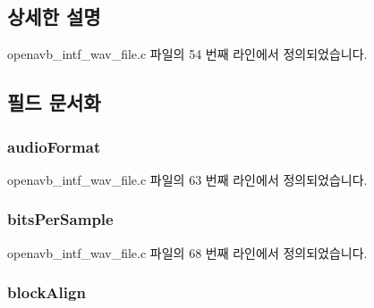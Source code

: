 \subsection{상세한 설명}


openavb\+\_\+intf\+\_\+wav\+\_\+file.\+c 파일의 54 번째 라인에서 정의되었습니다.



\subsection{필드 문서화}
\subsubsection[{\texorpdfstring{audio\+Format}{audioFormat}}]{ audio\+Format}\hypertarget{structwav__file__header__t_af52103d231ab295e9e2ca65d555a770c}{}\label{structwav__file__header__t_af52103d231ab295e9e2ca65d555a770c}


openavb\+\_\+intf\+\_\+wav\+\_\+file.\+c 파일의 63 번째 라인에서 정의되었습니다.

\subsubsection[{\texorpdfstring{bits\+Per\+Sample}{bitsPerSample}}]{ bits\+Per\+Sample}\hypertarget{structwav__file__header__t_ab13c239e2d7f495bd7d2cfaaa2ddc7b7}{}\label{structwav__file__header__t_ab13c239e2d7f495bd7d2cfaaa2ddc7b7}


openavb\+\_\+intf\+\_\+wav\+\_\+file.\+c 파일의 68 번째 라인에서 정의되었습니다.

\subsubsection[{\texorpdfstring{block\+Align}{blockAlign}}]{ block\+Align}\hypertarget{structwav__file__header__t_a65970038579a1c6b3ec158d29250de36}{}\label{structwav__file__header__t_a65970038579a1c6b3ec158d29250de36}


